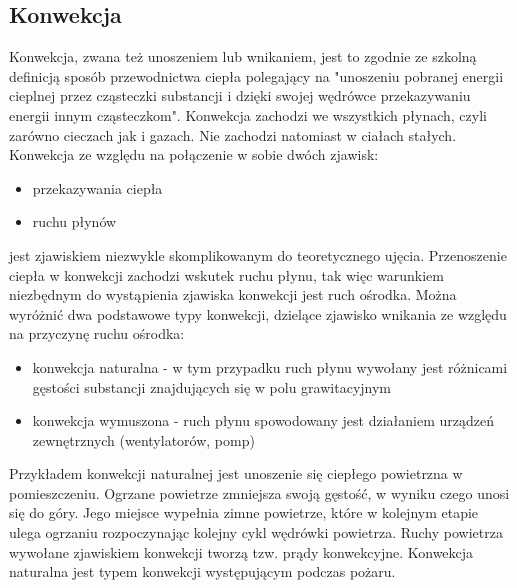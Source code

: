 \subsection{Konwekcja}
\label{Konwekcja}
Konwekcja, zwana też unoszeniem lub wnikaniem, jest to zgodnie ze szkolną definicją sposób przewodnictwa ciepła polegający na
"unoszeniu pobranej energii cieplnej przez cząsteczki substancji i dzięki swojej wędrówce przekazywaniu
energii innym cząsteczkom". 
Konwekcja zachodzi we wszystkich płynach, czyli zarówno cieczach jak i gazach. Nie zachodzi natomiast w ciałach stałych.
Konwekcja ze względu na połączenie w sobie dwóch zjawisk: 
\begin{itemize}
\item przekazywania ciepła
\item ruchu płynów
\end{itemize}
jest zjawiskiem niezwykle skomplikowanym do teoretycznego ujęcia. Przenoszenie ciepła w konwekcji zachodzi 
wskutek ruchu płynu, tak więc warunkiem niezbędnym do wystąpienia zjawiska konwekcji jest ruch ośrodka.
Można wyróżnić dwa podstawowe typy konwekcji, dzielące zjawisko wnikania ze względu na przyczynę ruchu ośrodka:
\begin{itemize}
\item konwekcja naturalna - w tym przypadku ruch płynu wywołany jest różnicami gęstości substancji znajdujących się w polu grawitacyjnym
\item konwekcja wymuszona - ruch płynu spowodowany jest działaniem urządzeń zewnętrznych (wentylatorów, pomp)
\end {itemize}
Przykładem konwekcji naturalnej jest unoszenie się ciepłego powietrzna w pomieszczeniu. 
Ogrzane powietrze zmniejsza swoją gęstość, w wyniku czego unosi się do góry. Jego miejsce wypełnia zimne powietrze, 
które w kolejnym etapie ulega ogrzaniu rozpoczynając kolejny cykl wędrówki powietrza. Ruchy powietrza wywołane zjawiskiem 
konwekcji tworzą tzw. prądy konwekcyjne.
 Konwekcja naturalna jest typem konwekcji występującym podczas pożaru. 

